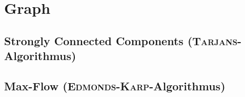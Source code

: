 \section{Graph}

\subsection{Strongly Connected Components (\textsc{Tarjans}-Algorithmus)}


\subsection{Max-Flow (\textsc{Edmonds-Karp}-Algorithmus)}
